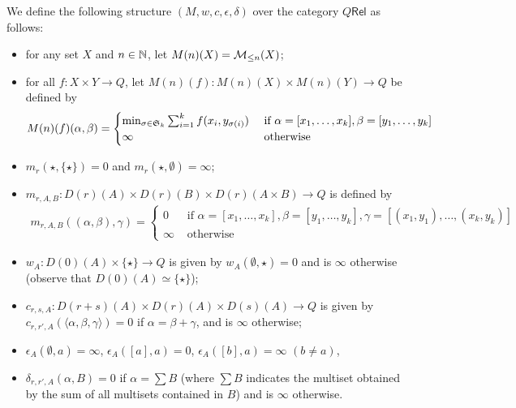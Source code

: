 \begin{definition}
We define the following structure $(M,w,c,\epsilon,\delta)$ over the category $Q\mathsf{Rel}$ as follows:
\begin{itemize}
\item for any set $X$ and $n\in \mathbb{N}$, let $M(n)(X)=\mathcal{M}_{\leq n}(X)$;

\item for all $f: X\times Y\to Q$, let $M(n)(f): M(n)(X)\times M(n)(Y)\to Q$ be defined by 
\begin{align*}
M(n)(f)(\alpha,\beta)=
\begin{cases}
\min_{\sigma\in \mathfrak{S}_{k}}\sum_{i=1}^{k}f(x_{i},y_{\sigma(i)}) & 
\text{ if }\alpha=[x_{1},\dots, x_{k}], \beta=[y_{1},\dots, y_{k}]\\
\infty & \text{ otherwise}
\end{cases}
\end{align*}


\item $m_{r}(\star, \{\star\})=0$ and $m_{r}(\star, \emptyset)=\infty$;

\item $m_{r,A,B}: D(r)(A)\times D(r)(B)\times D(r)(A\times B)\to Q$ is defined by 
\begin{align*}
m_{r,A,B}((\alpha,\beta), \gamma)=
\begin{cases}
0 & \text{ if } \alpha=[x_{1},\dots, x_{k}], \beta=[y_{1},\dots, y_{k}], \gamma= [(x_{1},y_{1}),\dots, (x_{k},y_{k})]\\
\infty & \text{ otherwise}
\end{cases}
\end{align*}

\item $w_{A}:D(0)(A)\times \{\star\}\to Q$ is given by $w_{A}(\emptyset, \star)=0$ and is $\infty$ otherwise (observe that $D(0)(A)\simeq \{\star\}$);

\item $c_{r,s,A}: D(r+s)(A)\times D(r)(A)\times D(s)(A)\to Q$ is given by $c_{r,r',A}(\langle\alpha, \beta,\gamma\rangle)=0$ if $\alpha=\beta+\gamma$, and is $\infty$ otherwise;

\item $\epsilon_{A}(\emptyset, a)=\infty$, $\epsilon_{A}([a],a)=0$, $\epsilon_{A}([b],a)=\infty$ $(b\neq a)$,

\item $\delta_{r,r',A}(\alpha, B)=0$ if $\alpha= \sum B$ (where $\sum B$ indicates the multiset obtained by the sum of all multisets contained in $B$) and is $\infty$ otherwise.




\end{itemize}

\end{definition}



